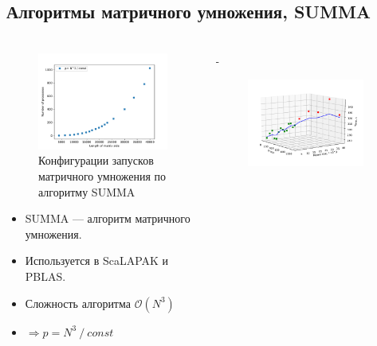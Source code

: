 \documentclass[unicode, t, 11pt]{beamer}%
\newlength{\mylen}
\begin{document}
		\subsection{Алгоритмы матричного умножения, SUMMA}
			\begin{frame}
				\footnotesize
				\frametitle{\insertsection}
		 		\framesubtitle{\insertsubsection}
		 		\begin{columns}[T]
		 			\setlength{\mylen}{0.5\textwidth}
		 			\begin{column}{\mylen}
		 				\begin{figure}
							\captionsetup{font=tiny, labelfont=tiny}
							\includegraphics[width=.83\textwidth]{./images/conf_SUMMA}
							\caption{Конфигурации запусков матричного умножения по алгоритму SUMMA}
						\end{figure}
						\begin{itemize}[label = \(\bullet\)]
					 		\item SUMMA — алгоритм матричного умножения.
					 		\item Используется в ScaLAPAK и PBLAS.
					 		\item Сложность алгоритма \(\mathcal{O}(N^3)\)
			 				\item \(\Rightarrow p = N^3\:/\:const\)
					 	\end{itemize}	 			
		 			\end{column}
		 			\begin{column}{\dimexpr\textwidth-\mylen}
			 			\begin{figure}
			 				\captionsetup{font=tiny, labelfont=tiny}
							\centering
							\includegraphics[width=0.9\textwidth]{./images/graph_SUMMA}

\end{figure}
\end{column}
\end{columns}
\end{frame}
\end{document}
